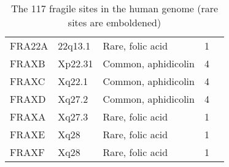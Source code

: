 \documentclass[phd,tocprelim]{cornell}
\begin{document}
\begin{table}
\begin{tabular}{l*{4}{l}}
     FRA22A & 22q13.1  & Rare, folic acid    & 1 \\
     FRAXB  & Xp22.31  & Common, aphidicolin   & 4 \\
     FRAXC  & Xq22.1   & Common, aphidicolin   & 4 \\
     FRAXD  & Xq27.2   & Common, aphidicolin   & 4 \\
     FRAXA  & Xq27.3   & Rare, folic acid    & 1 \\
     FRAXE  & Xq28     & Rare, folic acid    & 1 \\
     FRAXF  & Xq28     & Rare, folic acid    & 1 \\
    \bottomrule
  \end{tabular}
  \caption{The 117 fragile sites in the human genome (rare sites are emboldened)}
\label{tab:CFS}
\end{table}

%
%


\end{document}
